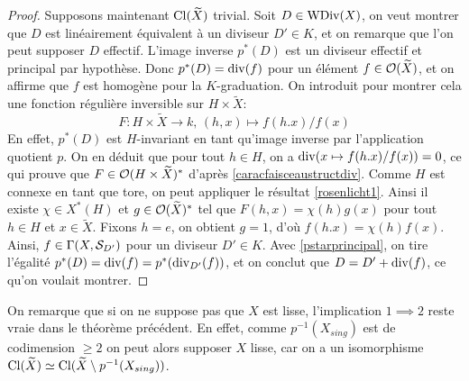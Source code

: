 \begin{proof}
Supposons maintenant $\operatorname{Cl}(\widetilde{X})$ trivial. Soit $D\in\operatorname{WDiv}(X)$, on veut montrer que $D$ est linéairement équivalent à un diviseur $D'\in K$, et on remarque que l'on peut supposer $D$ effectif. L'image inverse $p^*(D)$ est un diviseur effectif et principal par hypothèse. Donc $p^*(D)=\operatorname{div}(f)$ pour un élément $f\in \mathcal{O}(\widetilde{X})$, et on affirme que $f$ est homogène pour la $K$-graduation. On introduit pour montrer cela une fonction régulière inversible sur $H\times \widetilde{X}$:
$$F:H\times \widetilde{X}\rightarrow k,\,(h,x)\mapsto f(h.x)/f(x)$$
En effet, $p^*(D)$ est $H$-invariant en tant qu'image inverse par l'application quotient $p$. On en déduit que pour tout $h\in H$, on a $\operatorname{div}(x\mapsto f(h.x)/f(x))=0$, ce qui prouve que $F\in \mathcal{O}(H\times \widetilde{X})^*$ d'après \ref{caracfaisceaustructdiv}. Comme $H$ est connexe en tant que tore, on peut appliquer le résultat \ref{rosenlicht1}. Ainsi il existe $\chi \in X^*(H)$ et $g\in\mathcal{O}(\widetilde{X})^*$ tel que $F(h,x)=\chi(h)g(x)$ pour tout $h\in H$ et $x\in \widetilde{X}$. Fixons $h=e$, on obtient $g=1$, d'où $f(h.x)=\chi(h)f(x)$. Ainsi, $f\in \Gamma(X, \mathcal{S}_{D'})$ pour un diviseur $D'\in K$. Avec \ref{pstarprincipal}, on tire l'égalité $p^*(D)=\operatorname{div}(f)=p^*(\operatorname{div}_{D'}(f))$, et on conclut que $D=D'+\operatorname{div}(f)$, ce qu'on voulait montrer.
\end{proof}

\begin{rem}
On remarque que si on ne suppose pas que $X$ est lisse, l'implication $1\implies 2$ reste vraie dans le théorème précédent. En effet, comme $p^{-1}(X_{sing})$ est de codimension $\geq 2$ on peut alors supposer $X$ lisse, car on a un isomorphisme $\operatorname{Cl}(\widetilde{X})\simeq\operatorname{Cl}(\widetilde{X}\setminus p^{-1}(X_{sing}))$. 
\end{rem}



